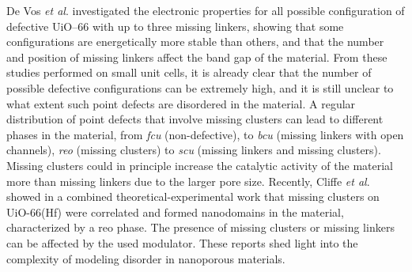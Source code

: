 De Vos \textit{et al}.\cite{devos2017missing} investigated the electronic properties for all possible configuration of defective UiO--66 with up to three missing linkers, showing that some configurations are energetically more stable than others, and that the number and position of missing linkers affect the band gap of the material. From these studies performed on small unit cells, it is already clear that the number of possible defective configurations can be extremely high, and it is still unclear to what extent such point defects are disordered in the material. A regular distribution of point defects that involve missing clusters can lead to different phases in the material, from \textit{fcu} (non-defective), to \textit{bcu} (missing linkers with open channels), \textit{reo} (missing clusters) to \textit{scu} (missing linkers and missing clusters). Missing clusters could in principle increase the catalytic activity of the material more than missing linkers due to the larger pore size. Recently, Cliffe \textit{et al}. \cite{cliffe2014correlated} showed in a combined theoretical-experimental work that missing clusters on UiO-66(Hf) were correlated and formed nanodomains in the material, characterized by a reo phase. The presence of missing clusters or missing linkers can be affected by the used modulator\cite{svane2018vacancy}. These reports shed light into the complexity of modeling disorder in nanoporous materials. 

